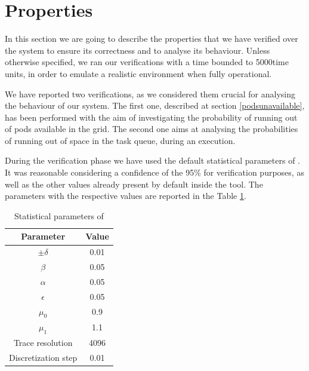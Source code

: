 \newcommand{\tauconst}{5000}
\newcommand{\query}{[INSERIRE LA QUERY CON NOTAZIONE CTL]}
\newcommand{\mT}{\ensuremath{\mu_T}}
\newcommand{\vT}{\ensuremath{\sigma_T}}
\newcommand{\mH}{\ensuremath{\mu_H}}
\newcommand{\vH}{\ensuremath{\sigma_H}}
\newcommand{\K}{\ensuremath{K}}
\newcommand{\expdel}{\ensuremath{\lambda}}

\section{Properties}
In this section we are going to describe the properties that we have verified over the system to ensure its correctness and to analyse its behaviour. Unless otherwise specified, we ran our verifications with a time bounded to \tauconst \space time units, in order to emulate a realistic environment when fully operational.

We have reported two verifications, as we considered them crucial for analysing the behaviour of our system. The first one, described at section \ref{podsunavailable}, has been performed with the aim of investigating the probability of running out of pods available in the grid. The second one aims at analysing the probabilities of running out of space in the task queue, during an execution.

During the verification phase we have used the default statistical parameters of \UPPAAL. It was reasonable considering a confidence of the 95\% for verification purposes, as well as the other values already present by default inside the tool. The parameters with the respective values are reported in the Table \ref{tab:statparam}.

\begin{table}[h]
    \centering
        \begin{tabular}{|c c|} 
            \hline
            Parameter & Value \\ [0.5ex] 
            \hline\hline
            $\pm\delta$ & 0.01 \\
            $\beta$ & 0.05 \\
            $\alpha$ & 0.05 \\
            $\epsilon$ & 0.05 \\
            $\mu_0$ & 0.9 \\
            $\mu_1$ & 1.1 \\
            Trace resolution & 4096 \\
            Discretization step & 0.01 \\ [0.5ex] 
            \hline
        \end{tabular}
        \caption{Statistical parameters of \UPPAAL}
        \label{tab:statparam}
\end{table}

